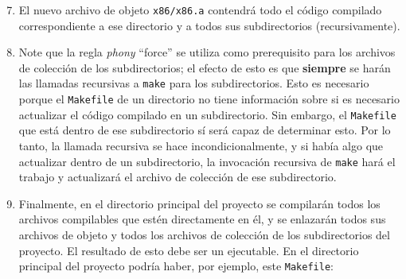 \documentclass[]{article}
\newenvironment{Shaded}{}{}
\newcommand{\DataTypeTok}[1]{\textcolor[rgb]{0.56,0.13,0.00}{{#1}}}
\newcommand{\DecValTok}[1]{\textcolor[rgb]{0.25,0.63,0.44}{{#1}}}
\newcommand{\CharTok}[1]{\textcolor[rgb]{0.25,0.44,0.63}{{#1}}}
\newcommand{\NormalTok}[1]{{#1}}
\begin{document}
\begin{Shaded}
\end{Shaded}
\begin{enumerate}[1.]
\setcounter{enumi}{6}
\item
  El nuevo archivo de objeto \texttt{x86/x86.a} contendrá todo el código
  compilado correspondiente a ese directorio y a todos sus
  subdirectorios (recursivamente).
\item
  Note que la regla \emph{phony} ``force'' se utiliza como prerequisito
  para los archivos de colección de los subdirectorios; el efecto de
  esto es que \textbf{siempre} se harán las llamadas recursivas a
  \texttt{make} para los subdirectorios. Esto es necesario porque el
  \texttt{Makefile} de un directorio no tiene información sobre si es
  necesario actualizar el código compilado en un subdirectorio. Sin
  embargo, el \texttt{Makefile} que está dentro de ese subdirectorio sí
  será capaz de determinar esto. Por lo tanto, la llamada recursiva se
  hace incondicionalmente, y si había algo que actualizar dentro de un
  subdirectorio, la invocación recursiva de \texttt{make} hará el
  trabajo y actualizará el archivo de colección de ese subdirectorio.
\item
  Finalmente, en el directorio principal del proyecto se compilarán
  todos los archivos compilables que estén directamente en él, y se
  enlazarán todos sus archivos de objeto y todos los archivos de
  colección de los subdirectorios del proyecto. El resultado de esto
  debe ser un ejecutable. En el directorio principal del proyecto podría
  haber, por ejemplo, este \texttt{Makefile}:
\end{enumerate}
\end{document}
